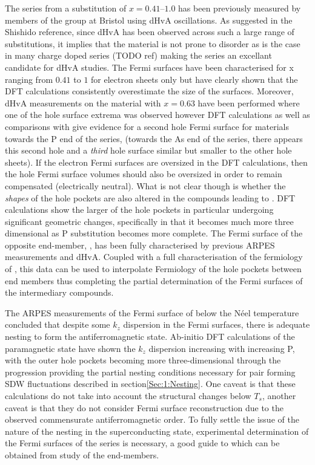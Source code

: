 The \BaFePAs series from a substitution of $x=0.41$--$1.0$ has been previously measured by members of the group at Bristol using dHvA oscillations\cite{Shishido2010}. As suggested in the Shishido reference, since dHvA has been observed across such a large range of substitutions, it implies that the material is not prone to disorder as is the case in many charge doped series (TODO ref) making the series an excellant candidate for dHvA studies. The Fermi surfaces have been characterised for x ranging from $0.41$ to $1$ for electron sheets only but have clearly shown that the DFT calculations consistently overestimate the size of the surfaces. Moreover, dHvA measurements on the material with $x=0.63$ have been performed where one of the hole surface extrema was observed\cite{Analytis2010c} however DFT calculations as well as comparisons with \SrFeP\cite{Analytis2009} give evidence for a second hole Fermi surface for materials towards the P end of the series, (towards the As end of the series, there appears this second hole and a \textit{third} hole surface similar but smaller to the other hole sheets). If the electron Fermi surfaces are oversized in the DFT calculations, then the hole Fermi surface volumes should also be oversized in order to remain compensated (electrically neutral). What is not clear though is whether the \textit{shapes} of the hole pockets are also altered in the compounds leading to \BaFeP. DFT calculations show the larger of the hole pockets in particular undergoing significant geometric changes, specifically in that it becomes much more three dimensional as P substitution becomes more complete. The Fermi surface of the opposite end-member, \BaFeAs, has been fully characterised by previous ARPES measurements\cite{Kondo2010a} and dHvA\cite{Terashima2011, Analytis2010b}. Coupled with a full characterisation of the fermiology of \BaFeP, this data can be used to interpolate Fermiology of the hole pockets between end members thus completing the partial determination of the Fermi surfaces of the intermediary compounds.

The ARPES measurements of the Fermi surface of \BaFeAs below the N\'eel temperature concluded that despite some $k_z$ dispersion in the Fermi surfaces, there is adequate nesting to form the antiferromagnetic state. Ab-initio DFT calculations\cite{Shishido2010} of the paramagnetic state have shown the $k_z$ dispersion increasing with increasing P, with the outer hole pockets becoming more three-dimensional through the progression providing the partial nesting conditions necessary for pair forming SDW fluctuations described in section\ref{Sec:1:Nesting}. One caveat is that these calculations do not take into account the structural changes below $T_s$, another caveat is that they do not consider Fermi surface reconstruction due to the observed commensurate antiferromagnetic order. To fully settle the issue of the nature of the nesting in the superconducting state, experimental determination of the Fermi surfaces of the series is necessary, a good guide to which can be obtained from study of the end-members.


